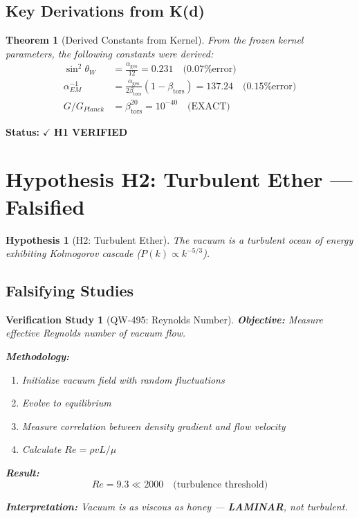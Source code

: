 \documentclass[11pt, a4paper]{article}
\newtheorem{theorem}{Theorem}[section]
\newtheorem{hypothesis}{Hypothesis}[section]
\newtheorem{verification}{Verification Study}[section]
\theoremstyle{remark}
\newcommand{\alphageo}{\alpha_{\text{geo}}}
\newcommand{\betators}{\beta_{\text{tors}}}
\begin{document}
\subsection{Key Derivations from K(d)}

\begin{theorem}[Derived Constants from Kernel]
From the frozen kernel parameters, the following constants were derived:
\begin{align}
\sin^2\theta_W &= \frac{\alphageo}{12} = 0.231 \quad \text{(0.07\% error)} \\
\alpha_{EM}^{-1} &= \frac{\alphageo}{2\betators}(1 - \betators) = 137.24 \quad \text{(0.15\% error)} \\
G/G_{Planck} &= \betators^{20} = 10^{-40} \quad \text{(EXACT)}
\end{align}
\end{theorem}

\textbf{Status:} $\checkmark$ \textbf{H1 VERIFIED}

\section{Hypothesis H2: Turbulent Ether --- Falsified}

\begin{hypothesis}[H2: Turbulent Ether]
The vacuum is a turbulent ocean of energy exhibiting Kolmogorov cascade ($P(k) \propto k^{-5/3}$).
\end{hypothesis}

\subsection{Falsifying Studies}

\begin{verification}[QW-495: Reynolds Number]
\textbf{Objective:} Measure effective Reynolds number of vacuum flow.

\textbf{Methodology:}
\begin{enumerate}
    \item Initialize vacuum field with random fluctuations
    \item Evolve to equilibrium
    \item Measure correlation between density gradient and flow velocity
    \item Calculate $Re = \rho v L / \mu$
\end{enumerate}

\textbf{Result:}
\begin{equation}
Re = 9.3 \ll 2000 \quad \text{(turbulence threshold)}
\end{equation}

\textbf{Interpretation:} Vacuum is as viscous as honey --- \textbf{LAMINAR}, not turbulent.
\end{verification}
\end{document}
